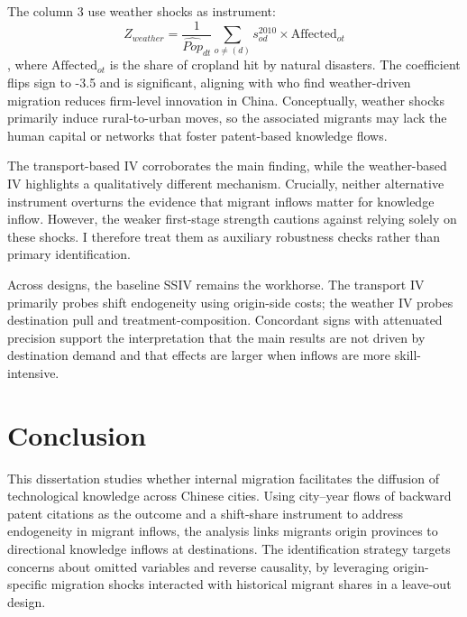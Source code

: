 \documentclass[12pt]{article}
\begin{document}
The column 3 use weather shocks as instrument: 
\begin{equation*}
  Z_{weather}= \frac{1}{\hat{Pop}_{dt}}\sum_{o \neq \text{}(d)}  s_{od}^{2010}\times \text{Affected}_{ot}
\end{equation*}
, where $\text{Affected}_{ot}$ is the share of cropland hit by natural disasters. The coefficient flips sign to -3.5 and is significant, aligning with \cite{imbertMigrantsFirmsEvidence2022} who find weather-driven migration reduces firm-level innovation in China. Conceptually, weather shocks primarily induce rural-to-urban moves, so the associated migrants may lack the human capital or networks that foster patent-based knowledge flows.

The transport-based IV corroborates the main finding, while the weather-based IV highlights a qualitatively different mechanism. Crucially, neither alternative instrument overturns the evidence that migrant inflows matter for knowledge inflow. However, the weaker first-stage strength cautions against relying solely on these shocks. I therefore treat them as auxiliary robustness checks rather than primary identification.

Across designs, the baseline SSIV remains the workhorse. The transport IV primarily probes shift endogeneity using origin-side costs; the weather IV probes destination pull and treatment-composition. Concordant signs with attenuated precision support the interpretation that the main results are not driven by destination demand and that effects are larger when inflows are more skill-intensive.




\section{Conclusion} \label{sec:conclusion}

This dissertation studies whether internal migration facilitates the diffusion of technological knowledge across Chinese cities. Using city--year flows of backward patent citations as the outcome and a shift-share instrument to address endogeneity in migrant inflows, the analysis links migrants origin provinces to directional knowledge inflows at destinations. The identification strategy targets concerns about omitted variables and reverse causality, by leveraging origin-specific migration shocks interacted with historical migrant shares in a leave-out design.
\end{document}
